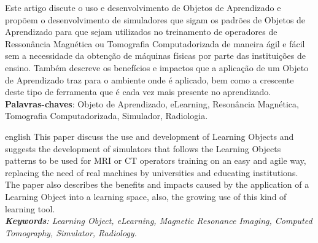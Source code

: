 \documentclass[12pt,openright,oneside,a4paper,english,french,spanish,brazil]{unifil}
\begin{document}
\par
\begin{resumo}

Este artigo discute o uso e desenvolvimento de Objetos de Aprendizado e propõem o desenvolvimento de simuladores que sigam os padrões de Objetos de Aprendizado para que sejam utilizados no treinamento de operadores de Ressonância Magnética ou Tomografia Computadorizada de maneira ágil e fácil sem a necessidade da obtenção de máquinas físicas por parte das instituições de ensino. Também descreve os benefícios e impactos que a aplicação de um Objeto de Aprendizado traz para o ambiente onde é aplicado, bem como a crescente deste tipo de ferramenta que é cada vez mais presente no aprendizado.
\vspace{\onelineskip} \\
\noindent
\textbf{Palavras-chaves}: Objeto de Aprendizado, eLearning, Resonância Magnética, Tomografia Computadorizada, Simulador, Radiologia.
\end{resumo}

\par
\begin{resumo}[Abstract]
\begin{otherlanguage*}{english}
This paper discuss the use and development of Learning Objects and suggests the development of simulators that follows the Learning Objects patterns to be used for MRI or CT operators training on an easy and agile way, replacing the need of real machines by universities and educating institutions. The paper also describes the benefits and impacts caused by the application of a Learning Object into a learning space, also, the growing use of this kind of learning tool.
\emph{
}
\vspace{\onelineskip}\\
\noindent
\emph{	
\textbf{Keywords}: Learning Object, eLearning, Magnetic Resonance Imaging, Computed Tomography, Simulator, Radiology.
}
\end{otherlanguage*}
\end{resumo}
\end{document}
